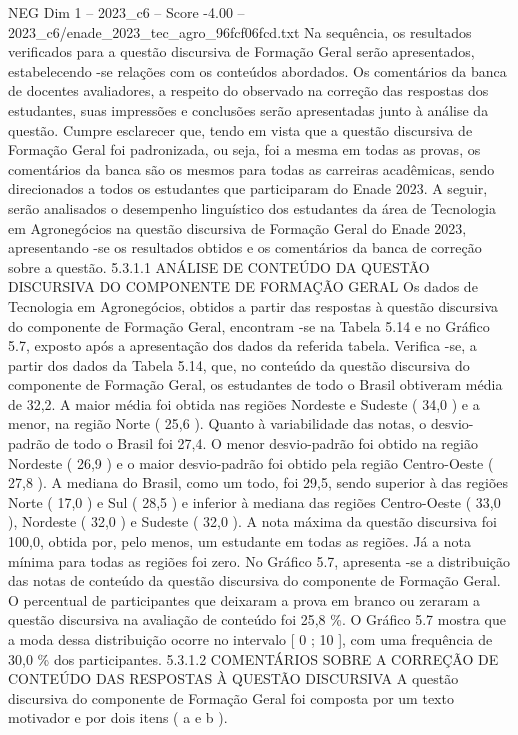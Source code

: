 \begin{textsample}{NEG Dim 1 – 2023\_c6 – Score -4.00 – 2023\_c6/enade\_2023\_tec\_agro\_96fcf06fcd.txt}
Na sequência, os resultados verificados para a questão discursiva de Formação Geral serão apresentados, estabelecendo -se relações com os conteúdos abordados.
Os comentários da banca de docentes avaliadores, a respeito do observado na correção das respostas dos estudantes, suas impressões e conclusões serão apresentadas junto à análise da questão.
Cumpre esclarecer que, tendo em vista que a questão discursiva de Formação Geral foi padronizada, ou seja, foi a mesma em todas as provas, os comentários da banca são os mesmos para todas as carreiras acadêmicas, sendo direcionados a todos os estudantes que participaram do Enade 2023.
A seguir, serão analisados o desempenho linguístico dos estudantes da área de Tecnologia em Agronegócios na questão discursiva de Formação Geral do Enade 2023, apresentando -se os resultados obtidos e os comentários da banca de correção sobre a questão. 5.3.1.1 ANÁLISE DE CONTEÚDO DA QUESTÃO DISCURSIVA DO COMPONENTE DE FORMAÇÃO GERAL Os dados de Tecnologia em Agronegócios, obtidos a partir das respostas à questão discursiva do componente de Formação Geral, encontram -se na Tabela 5.14 e no Gráfico 5.7, exposto após a apresentação dos dados da referida tabela.
Verifica -se, a partir dos dados da Tabela 5.14, que, no conteúdo da questão discursiva do componente de Formação Geral, os estudantes de todo o Brasil obtiveram média de 32,2.
A maior média foi obtida nas regiões Nordeste e Sudeste ( 34,0 ) e a menor, na região Norte ( 25,6 ).
Quanto à variabilidade das notas, o desvio-padrão de todo o Brasil foi 27,4.
O menor desvio-padrão foi obtido na região Nordeste ( 26,9 ) e o maior desvio-padrão foi obtido pela região Centro-Oeste ( 27,8 ).
A mediana do Brasil, como um todo, foi 29,5, sendo superior à das regiões Norte ( 17,0 ) e Sul ( 28,5 ) e inferior à mediana das regiões Centro-Oeste ( 33,0 ), Nordeste ( 32,0 ) e Sudeste ( 32,0 ).
A nota máxima da questão discursiva foi 100,0, obtida por, pelo menos, um estudante em todas as regiões.
Já a nota mínima para todas as regiões foi zero.
No Gráfico 5.7, apresenta -se a distribuição das notas de conteúdo da questão discursiva do componente de Formação Geral.
O percentual de participantes que deixaram a prova em branco ou zeraram a questão discursiva na avaliação de conteúdo foi 25,8 \%.
O Gráfico 5.7 mostra que a moda dessa distribuição ocorre no intervalo [ 0 ; 10 ], com uma frequência de 30,0 \% dos participantes. 5.3.1.2 COMENTÁRIOS SOBRE A CORREÇÃO DE CONTEÚDO DAS RESPOSTAS À QUESTÃO DISCURSIVA A questão discursiva do componente de Formação Geral foi composta por um texto motivador e por dois itens ( a e b ).

\end{textsample}
